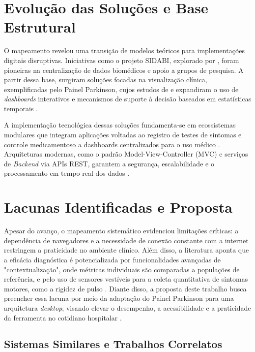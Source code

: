 \section{Evolução das Soluções e Base Estrutural}
\label{sec:EvolucaoSolucoes}

O mapeamento revelou uma transição de modelos teóricos para implementações digitais disruptivas. Iniciativas como o projeto SIDABI, explorado por , foram pioneiras na centralização de dados biomédicos e apoio a grupos de pesquisa. A partir dessa base, surgiram soluções focadas na visualização clínica, exemplificadas pelo Painel Parkinson, cujos estudos de  e  expandiram o uso de \textit{dashboards} interativos e mecanismos de suporte à decisão baseados em estatísticas temporais .

A implementação tecnológica dessas soluções fundamenta-se em ecossistemas modulares que integram aplicações voltadas ao registro de testes de sintomas e controle medicamentoso a dashboards centralizados para o uso médico . Arquiteturas modernas, como o padrão Model-View-Controller (MVC) e serviços de \textit{Backend} via APIs REST, garantem a segurança, escalabilidade e o processamento em tempo real dos dados .

\section{Lacunas Identificadas e Proposta}
\label{sec:Lacunas}

Apesar do avanço, o mapeamento sistemático evidenciou limitações críticas: a dependência de navegadores e a necessidade de conexão constante com a internet restringem a praticidade no ambiente clínico. Além disso, a literatura aponta que a eficácia diagnóstica é potencializada por funcionalidades avançadas de "contextualização", onde métricas individuais são comparadas a populações de referência, e pelo uso de sensores vestíveis para a coleta quantitativa de sintomas motores, como a rigidez de pulso . Diante disso, a proposta deste trabalho busca preencher essa lacuna por meio da adaptação do Painel Parkinson para uma arquitetura \textit{desktop}, visando elevar o desempenho, a acessibilidade e a praticidade da ferramenta no cotidiano hospitalar .

\subsection{Sistemas Similares e Trabalhos Correlatos}
\label{subsec:sistemas_similares_correlatos}

